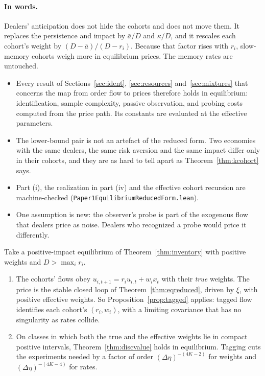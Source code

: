 \paragraph{In words.} Dealers' anticipation does not hide the cohorts and does not move them. It replaces the persistence and impact by $\bar a/D$ and $\kappa/D$, and it rescales each cohort's weight by $(D-\bar a)/(D-r_i)$. Because that factor rises with $r_i$, slow-memory cohorts weigh more in equilibrium prices. The memory rates are untouched.
\begin{itemize}[itemsep=1pt,topsep=2pt]
\item Every result of Sections~\ref{sec:ident}, \ref{sec:resources} and~\ref{sec:mixtures} that concerns the map from order flow to prices therefore holds in equilibrium: identification, sample complexity, passive observation, and probing costs computed from the price path. Its constants are evaluated at the effective parameters.
\item The lower-bound pair is not an artefact of the reduced form. Two economies with the same dealers, the same risk aversion and the same impact differ only in their cohorts, and they are as hard to tell apart as Theorem~\ref{thm:kcohort} says.
\item Part (i), the realization in part (iv) and the effective cohort recursion are machine-checked (\nolinkurl{Paper1EquilibriumReducedForm.lean}).
\item One assumption is new: the observer's probe is part of the exogenous flow that dealers price as noise. Dealers who recognized a probe would price it differently.
\end{itemize}

\begin{corollary}\label{cor:eqdisclosure}
Take a positive-impact equilibrium of Theorem~\ref{thm:inventory} with positive weights and $D>\max_ir_i$.
\begin{enumerate}[label=(\roman*),itemsep=1pt]
\item The cohorts' flows obey $u_{i,t+1}=r_iu_{i,t}+w_ix_t$ with their \emph{true} weights. The price is the stable closed loop of Theorem~\ref{thm:eqreduced}, driven by $\xi$, with positive effective weights. So Proposition~\ref{prop:tagged} applies: tagged flow identifies each cohort's $(r_i,w_i)$, with a limiting covariance that has no singularity as rates collide.
\item On classes in which both the true and the effective weights lie in compact positive intervals, Theorem~\ref{thm:discvalue} holds in equilibrium. Tagging cuts the experiments needed by a factor of order $(\Delta\eta)^{-(4K-2)}$ for weights and $(\Delta\eta)^{-(4K-4)}$ for rates.
\end{enumerate}
\end{corollary}

